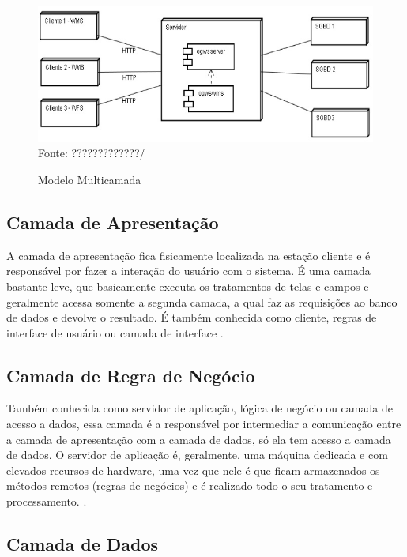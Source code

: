 \begin{figure}[!htpb]
	\centering
	\caption{Modelo Multicamada}
	\label{f_c2_multicamada}
	\includegraphics[width=14cm]{images/multicamada.jpg}\\
    Fonte: ?????????????/
 
\end{figure}

\subsection{Camada de Apresentação}

A camada de apresentação fica fisicamente localizada na estação cliente e é responsável por fazer a interação do usuário com o sistema. É uma camada bastante leve, que basicamente executa os tratamentos de telas e campos e geralmente acessa somente a segunda camada, a qual faz as requisições ao banco de dados e devolve o resultado. É também conhecida como cliente, regras de interface de usuário ou camada de interface \cite{devmediaMultiCamada2018}.

\subsection{Camada de Regra de Negócio}

Também conhecida como servidor de aplicação, lógica de negócio ou camada de acesso a dados, essa camada é a responsável por intermediar a comunicação entre a camada de apresentação com a camada de dados, só ela tem acesso a camada de dados. O servidor de aplicação é, geralmente, uma máquina dedicada e com elevados recursos de hardware, uma vez que nele é que ficam armazenados os métodos remotos (regras de negócios) e é realizado todo o seu tratamento e processamento. \cite{devmediaMultiCamada2018}.

\subsection{Camada de Dados}

